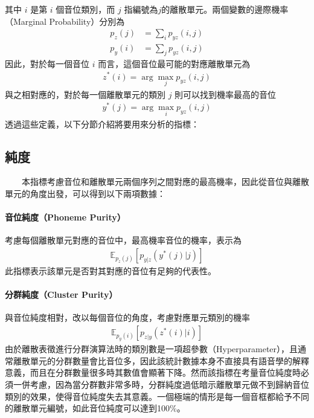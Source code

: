 {其中 $i$ 是第 $i$ 個音位類別，而 $j$ 指編號為$j$的離散單元。兩個變數的邊際機率（Marginal Probability）分別為
\begin{align}
    p_z(j) & =\sum_i{p_{yz}(i, j)} \\
    p_y(i) & =\sum_j{p_{yz}(i, j)}
\end{align}
因此，對於每一個音位 $i$ 而言，這個音位最可能的對應離散單元為
\begin{align}
    z^\ast(i) = \arg\max_j p_{yz}(i, j)
\end{align}
與之相對應的，對於每一個離散單元的類別 $j$ 則可以找到機率最高的音位
\begin{align}
    y^\ast(j) = \arg\max_i p_{yz}(i,j)
\end{align}
透過這些定義，以下分節介紹將要用來分析的指標：

\subsection{純度}

　　本指標考慮音位和離散單元兩個序列之間對應的最高機率，因此從音位與離散單元的角度出發，可以得到以下兩項數據：

\paragraph{音位純度（Phoneme Purity）}\hfill \break
%
        考慮每個離散單元對應的音位中，最高機率音位的機率，表示為
\begin{align}
    \mathbb{E}_{p_z(j)}\left[p_{y|z}(y^*(j)|j) \right]
\end{align}
此指標表示該單元是否對其對應的音位有足夠的代表性。

\paragraph{分群純度（Cluster Purity）}\hfill \break
%
        與音位純度相對，改以每個音位的角度，考慮對應單元類別的機率
\begin{align}
    \mathbb{E}_{p_y(i)}\left[p_{z|y}(z^*(i)|i) \right]
\end{align}
        由於離散表徵進行分群演算法時的類別數是一項超參數（Hyperparameter），且通常離散單元的分群數量會比音位多，因此該統計數據本身不直接具有語音學的解釋意義，而且在分群數量很多時其數值會顯著下降。然而該指標在考量音位純度時必須一併考慮，因為當分群數非常多時，分群純度過低暗示離散單元做不到歸納音位類別的效果，使得音位純度失去其意義。一個極端的情形是每一個音框都給予不同的離散單元編號，如此音位純度可以達到100\%。

}

